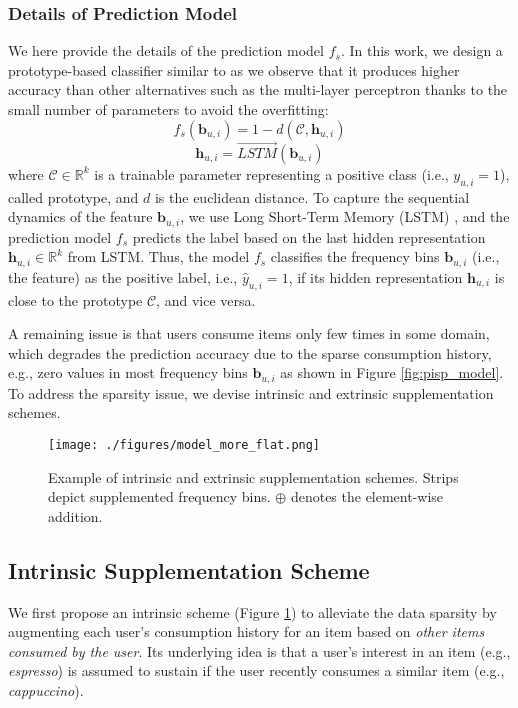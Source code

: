 \documentclass[sigconf]{acmart}
\begin{document}
\subsubsection{\textbf{Details of Prediction Model}}
\label{sec:detail}
We here provide the details of the prediction model $f_s$. In this work, we design a prototype-based classifier similar to \cite{mettes2019hyperspherical} as we observe that it produces higher accuracy than other alternatives such as the multi-layer perceptron thanks to the small number of parameters to avoid the overfitting:
\begin{equation*}
    f_s(\textbf{b}_{u,i}) = 1 - d(\mathcal{C}, \textbf{h}_{u,i})
\end{equation*}
\begin{equation*}
    \textbf{h}_{u,i}  = \overrightarrow{LSTM}(\textbf{b}_{u,i}) 
\end{equation*}
where $\mathcal{C} \in \mathbb{R}^k$ is a trainable parameter representing a positive class (i.e., $y_{u,i}=1$), called prototype, and $d$ is the euclidean distance. 
To capture the sequential dynamics of the feature $\textbf{b}_{u,i}$, we use Long Short-Term Memory (LSTM) \cite{hochreiter1997long}, and the prediction model $f_s$ predicts the label based on the last hidden representation $\textbf{h}_{u,i}\in \mathbb{R}^k$ from LSTM. 
Thus, the model $f_s$ classifies the frequency bins $\textbf{b}_{u,i}$ (i.e., the feature) as the positive label, i.e., $\hat{y}_{u,i}=1$, if its hidden representation $\textbf{h}_{u,i}$ is close to the prototype $\mathcal{C}$, and vice versa. 
  

A remaining issue is that users consume items only few times in some domain, which degrades the prediction accuracy due to the sparse consumption history, e.g., zero values in most frequency bins $\textbf{b}_{u,i}$ as shown in Figure \ref{fig:pisp_model}. To address the sparsity issue, we devise intrinsic and extrinsic supplementation schemes. 


\begin{figure}[t]
  \texttt{[image: ./figures/model\_more\_flat.png]}
  \caption{Example of intrinsic and extrinsic supplementation schemes. Strips depict supplemented frequency bins. $\oplus$ denotes the element-wise addition. 
  }
  \label{fig:schemes}
\end{figure}

\subsection{Intrinsic Supplementation Scheme}
\label{sec:in}
We first propose an intrinsic scheme (Figure \ref{fig:schemes}) to alleviate the data sparsity by augmenting each user's consumption history for an item based on \textit{other items consumed by the user}. 
Its underlying idea is that a user’s interest in an item (e.g., \textit{espresso}) is assumed to sustain if the user recently consumes a similar item (e.g., \textit{cappuccino}).
 
\end{document}
